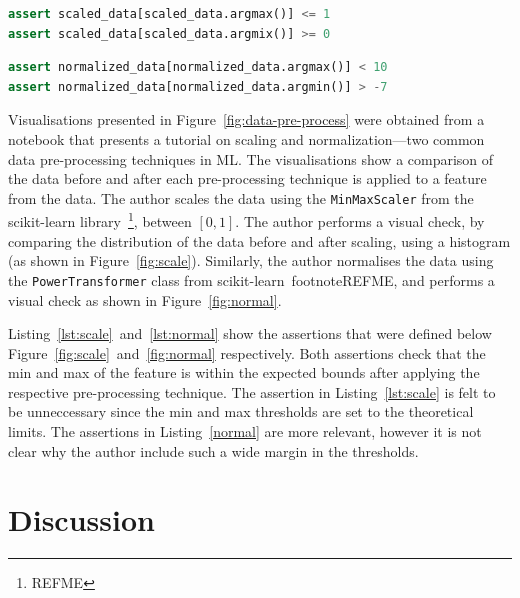 \documentclass[acmsmall,screen,review,anonymous]{acmart}
\begin{document}
\begin{minipage}{0.45\textwidth}
  \begin{lstlisting}[language=Python]
assert scaled_data[scaled_data.argmax()] <= 1
assert scaled_data[scaled_data.argmix()] >= 0
  \end{lstlisting}
  \label{lst:scale}
\end{minipage}
\hfill
\begin{minipage}{0.45\textwidth}
  \begin{lstlisting}[language=Python]
assert normalized_data[normalized_data.argmax()] < 10
assert normalized_data[normalized_data.argmin()] > -7
  \end{lstlisting}
  \label{lst:normal}
\end{minipage}

Visualisations presented in Figure~\ref{fig:data-pre-process} were obtained from a notebook that presents a tutorial on scaling and normalization---two common data pre-processing techniques in ML. The visualisations show a comparison of the data before and after each pre-processing technique is applied to a feature from the data. The author scales the data using the \texttt{MinMaxScaler} from the scikit-learn library~\footnote{REFME}, between $[0, 1]$. The author performs a visual check, by comparing the distribution of the data before and after scaling, using a histogram (as shown in Figure~\ref{fig:scale}). Similarly, the author normalises the data using the \texttt{PowerTransformer} class from scikit-learn~footnote{REFME}, and performs a visual check as shown in Figure~\ref{fig:normal}.

Listing~\ref{lst:scale}~and~\ref{lst:normal} show the assertions that were defined below Figure~\ref{fig:scale}~and~\ref{fig:normal} respectively. Both assertions check that the min and max of the feature is within the expected bounds after applying the respective pre-processing technique. The assertion in Listing~\ref{lst:scale} is felt to be unneccessary since the min and max thresholds are set to the theoretical limits. The assertions in Listing~\ref{normal} are more relevant, however it is not clear why the author include such a wide margin in the thresholds.

\section{Discussion}\label{sec:discuss}
\end{document}
